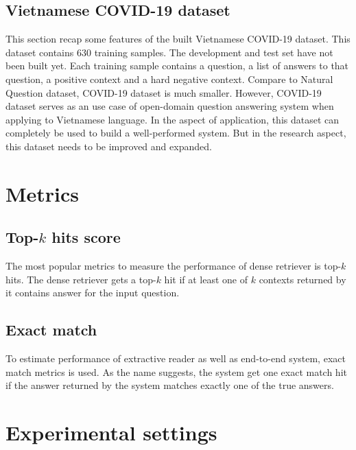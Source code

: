 \documentclass[12pt, sort&compress]{report}
\begin{document}
\subsection{Vietnamese COVID-19 dataset}
This section recap some features of the built Vietnamese COVID-19 dataset. This dataset contains 630 training samples. The development and test set have not been built yet. Each training sample contains a question, a list of answers to that question, a positive context and a hard negative context. Compare to Natural Question dataset, COVID-19 dataset is much smaller. However, COVID-19 dataset serves as an use case of open-domain question answering system when applying to Vietnamese language. In the aspect of application, this dataset can completely be used to build a well-performed system. But in the research aspect, this dataset needs to be improved and expanded. 
\section{Metrics}
\subsection{Top-$k$ hits score}
The most popular metrics to measure the performance of dense retriever is top-$k$ hits. The dense retriever gets a top-$k$ hit if at least one of $k$ contexts returned by it contains answer for the input question. 
\subsection{Exact match}
To estimate performance of extractive reader as well as end-to-end system, exact match metrics is used. As the name suggests, the system get one exact match hit if the answer returned by the system matches exactly one of the true answers. 
\section{Experimental settings}
\end{document}
